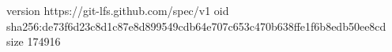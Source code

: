 version https://git-lfs.github.com/spec/v1
oid sha256:de73f6d23c8d1c87e8d899549cdb64e707c653c470b638ffe1f6b8edb50ee8cd
size 174916
